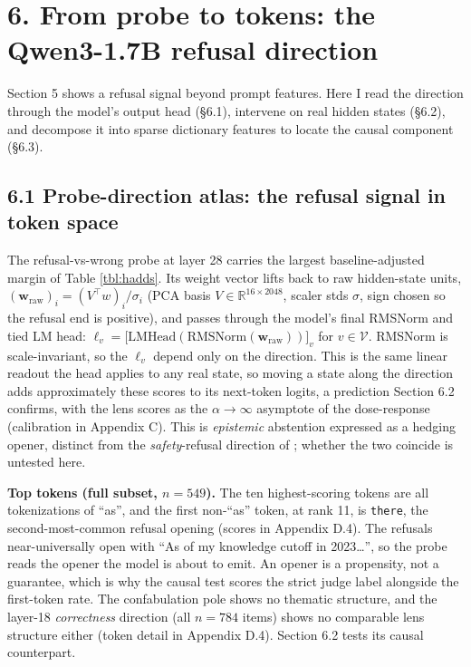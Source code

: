 \section{6. From probe to tokens: the Qwen3-1.7B refusal
direction}\label{from-probe-to-tokens-the-qwen3-1.7b-refusal-direction}

Section 5 shows a refusal signal beyond prompt features. Here I read the direction through the model's output head (§6.1), intervene on real hidden states (§6.2), and decompose it into sparse dictionary features to locate the causal component (§6.3).

\subsection{6.1 Probe-direction atlas: the refusal signal in token space}\label{probe-direction-atlas-what-the-refusal-signal-points-at-in-token-space}

The refusal-vs-wrong probe at layer 28 carries the largest
baseline-adjusted margin of Table \ref{tbl:hadds}. Its weight vector
lifts back to raw hidden-state units,
\((\mathbf{w}_{\mathrm{raw}})_i = (V^\top w)_i / \sigma_i\) (PCA basis
\(V \in \mathbb{R}^{16 \times 2048}\), scaler stds \(\sigma\), sign
chosen so the refusal end is positive), and passes through the model's final RMSNorm and tied LM head:
\(\ell_v = \big[\mathrm{LMHead}(\mathrm{RMSNorm}(\mathbf{w}_{\mathrm{raw}}))\big]_v\)
for \(v \in \mathcal{V}\). RMSNorm is scale-invariant, so the \(\ell_v\) depend only on the direction. This is the same linear readout the head applies to any real state, so moving a state along the direction adds approximately these scores to its next-token logits, a prediction Section 6.2 confirms, with the lens scores as the \(\alpha \to \infty\) asymptote of the dose-response (calibration in Appendix C). This is \emph{epistemic} abstention expressed as a hedging opener, distinct from the \emph{safety}-refusal direction of \citet{arditi2024refusal}; whether the two coincide is untested here.

\textbf{Top tokens (full subset, \(n=549\)).} The ten highest-scoring
tokens are all tokenizations of ``as'', and the first non-``as'' token,
at rank 11, is \texttt{there}, the second-most-common refusal opening (scores in Appendix D.4). The refusals near-universally open with ``As of my knowledge cutoff in 2023\ldots{}'', so the probe reads the opener the model is about to emit. An opener is a propensity, not a
guarantee, which is why the causal test scores the strict judge label
alongside the first-token rate. The confabulation pole shows no thematic
structure, and the layer-18 \emph{correctness} direction (all \(n=784\)
items) shows no comparable lens structure either (token detail in Appendix D.4). Section 6.2 tests its causal counterpart.

